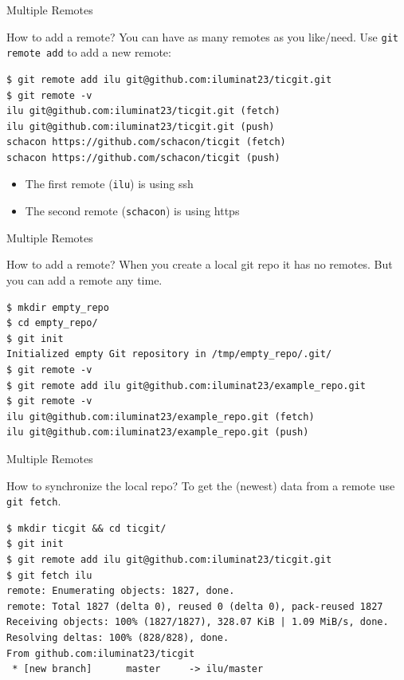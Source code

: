 \documentclass[aspectratio=169]{beamer}
\renewcommand{\footnotesize}{\tiny}
\newcommand{\sectiontitle}{}
\begin{document}
\begin{frame}[fragile]{Multiple Remotes}{\sectiontitle}
\begin{block}{How to add a remote?}
You can have as many remotes as you like/need. Use \verb|git remote add| to
add a new remote:
\begin{verbatim}
$ git remote add ilu git@github.com:iluminat23/ticgit.git
$ git remote -v
ilu	git@github.com:iluminat23/ticgit.git (fetch)
ilu	git@github.com:iluminat23/ticgit.git (push)
schacon	https://github.com/schacon/ticgit (fetch)
schacon	https://github.com/schacon/ticgit (push)
\end{verbatim}
\begin{itemize}
    \item The first remote (\verb|ilu|) is using ssh
    \item The second remote (\verb|schacon|) is using https
\end{itemize}
\end{block}
\end{frame}

\begin{frame}[fragile]{Multiple Remotes}{\sectiontitle}
\begin{block}{How to add a remote?}
When you create a local git repo it has no remotes. But you can add a remote any time.
\begin{verbatim}
$ mkdir empty_repo
$ cd empty_repo/
$ git init
Initialized empty Git repository in /tmp/empty_repo/.git/
$ git remote -v
$ git remote add ilu git@github.com:iluminat23/example_repo.git
$ git remote -v
ilu	git@github.com:iluminat23/example_repo.git (fetch)
ilu	git@github.com:iluminat23/example_repo.git (push)
\end{verbatim}
\end{block}
\end{frame}

\begin{frame}[fragile]{Multiple Remotes}{\sectiontitle}
\begin{block}{How to synchronize the local repo?}
To get the (newest) data from a remote use \verb|git fetch|.
\begin{verbatim}
$ mkdir ticgit && cd ticgit/
$ git init
$ git remote add ilu git@github.com:iluminat23/ticgit.git
$ git fetch ilu
remote: Enumerating objects: 1827, done.
remote: Total 1827 (delta 0), reused 0 (delta 0), pack-reused 1827
Receiving objects: 100% (1827/1827), 328.07 KiB | 1.09 MiB/s, done.
Resolving deltas: 100% (828/828), done.
From github.com:iluminat23/ticgit
 * [new branch]      master     -> ilu/master
\end{verbatim}
\end{block}
\end{frame}
\end{document}
